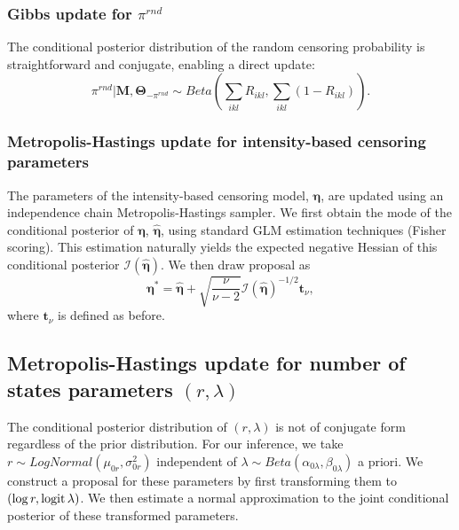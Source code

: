 \subsubsection{Gibbs update for $\pi^{rnd}$}

The conditional posterior distribution of the random censoring probability is straightforward and conjugate, enabling a direct update:
\begin{equation*}
\pi^{rnd} | \bm M, \bm \Theta_{-\pi^{rnd}} \sim Beta\left( \sum_{ikl} R_{ikl}, \sum_{ikl} (1 - R_{ikl}) \right) .
\end{equation*}


\subsubsection{Metropolis-Hastings update for intensity-based censoring parameters}

The parameters of the intensity-based censoring model, $\bm \eta$,
are updated using an independence chain Metropolis-Hastings sampler.
%
We first obtain the mode of the conditional posterior of $\bm \eta$, $\hat{\bm \eta}$, using standard GLM estimation techniques (Fisher scoring).
This estimation naturally yields the expected negative Hessian of this conditional posterior $\mathcal{I}(\hat{\bm{\eta}})$.
We then draw proposal as
\begin{equation*}
\bm{\eta}^* = \hat{\bm{\eta}} + \sqrt{\frac{\nu}{\nu - 2}} \mathcal{I}(\hat{\bm{\eta}})^{-1/2} \bm{t}_\nu,
\end{equation*}
where $\bm{t}_\nu$ is defined as before.


\subsection{Metropolis-Hastings update for number of states parameters $(r, \lambda)$}
\label{supp:proteomics:sec:draw_number_of_states_hyperparameters}

The conditional posterior distribution of $(r, \lambda)$ is not of conjugate form regardless of the prior distribution.
For our inference, we take $r \sim LogNormal(\mu_{0r}, \sigma^2_{0r})$ independent of $\lambda \sim Beta(\alpha_{0\lambda}, \beta_{0\lambda})$ a priori.
We construct a proposal for these parameters by first transforming them to $(\log r, \operatorname{logit} \lambda)$.
We then estimate a normal approximation to the joint conditional posterior of these transformed parameters.

